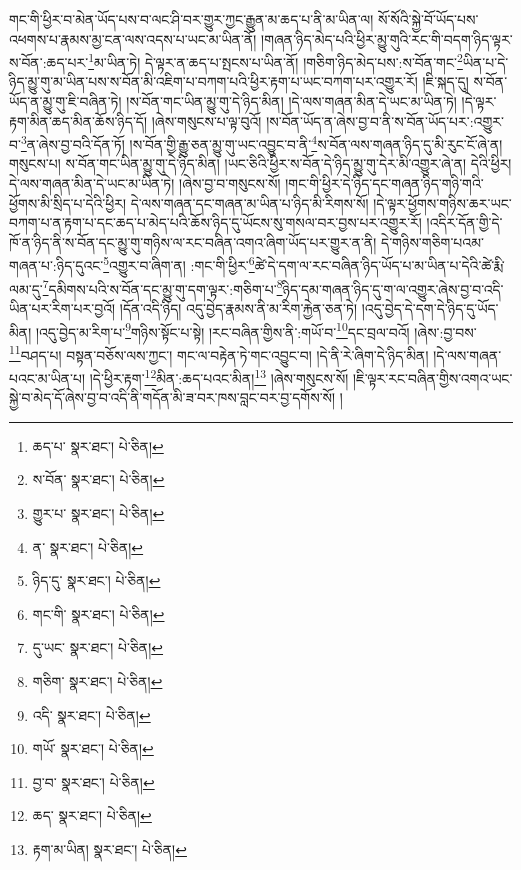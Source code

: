 གང་གི་ཕྱིར་བ་མེན་ཡོད་པས་བ་ལང་ཤི་བར་གྱུར་ཀྱང་རྒྱུན་མ་ཆད་པ་ནི་མ་ཡིན་ལ། སོ་སོའི་སྐྱེ་བོ་ཡོད་པས་འཕགས་པ་རྣམས་མྱ་ངན་ལས་འདས་པ་ཡང་མ་ཡིན་ནོ། །གཞན་ཉིད་མེད་པའི་ཕྱིར་མྱུ་གུའི་རང་གི་བདག་ཉིད་ལྟར་ས་བོན་:ཆད་པར་\footnote{ཆད་པ་  སྣར་ཐང་།  པེ་ཅིན། }མ་ཡིན་ཏེ། དེ་ལྟར་ན་ཆད་པ་སྤངས་པ་ཡིན་ནོ། །གཅིག་ཉིད་མེད་པས་:ས་བོན་གང་\footnote{ས་བོན་  སྣར་ཐང་།  པེ་ཅིན། }ཡིན་པ་དེ་ཉིད་མྱུ་གུ་མ་ཡིན་པས་ས་བོན་མི་འཇིག་པ་བཀག་པའི་ཕྱིར་རྟག་པ་ཡང་བཀག་པར་འགྱུར་རོ། །ཇི་སྐད་དུ། ས་བོན་ཡོད་ན་མྱུ་གུ་ཇི་བཞིན་ཏེ། །ས་བོན་གང་ཡིན་མྱུ་གུ་དེ་ཉིད་མིན། །དེ་ལས་གཞན་མིན་དེ་ཡང་མ་ཡིན་ཏེ། །དེ་ལྟར་རྟག་མིན་ཆད་མིན་ཆོས་ཉིད་དོ། །ཞེས་གསུངས་པ་ལྟ་བུའོ། །ས་བོན་ཡོད་ན་ཞེས་བྱ་བ་ནི་ས་བོན་ཡོད་པར་:འགྱུར་བ་\footnote{གྱུར་པ་  སྣར་ཐང་།  པེ་ཅིན། }ན་ཞེས་བྱ་བའི་དོན་ཏོ། །ས་བོན་གྱི་རྒྱུ་ཅན་མྱུ་གུ་ཡང་འབྱུང་བ་ནི་\footnote{ན་  སྣར་ཐང་།  པེ་ཅིན། }ས་བོན་ལས་གཞན་ཉིད་དུ་མི་རུང་ངོ་ཞེ་ན། གསུངས་པ། ས་བོན་གང་ཡིན་མྱུ་གུ་དེ་ཉིད་མིན། །ཡང་ཅིའི་ཕྱིར་ས་བོན་དེ་ཉིད་མྱུ་གུ་དེར་མི་འགྱུར་ཞེ་ན། དེའི་ཕྱིར། དེ་ལས་གཞན་མིན་དེ་ཡང་མ་ཡིན་ཏེ། །ཞེས་བྱ་བ་གསུངས་སོ། །གང་གི་ཕྱིར་དེ་ཉིད་དང་གཞན་ཉིད་གཉི་གའི་ཕྱོགས་མི་སྲིད་པ་དེའི་ཕྱིར། དེ་ལས་གཞན་དང་གཞན་མ་ཡིན་པ་ཉིད་མི་རིགས་སོ། །དེ་ལྟར་ཕྱོགས་གཉིས་ཆར་ཡང་བཀག་པ་ན་རྟག་པ་དང་ཆད་པ་མེད་པའི་ཆོས་ཉིད་དུ་ཡོངས་སུ་གསལ་བར་བྱས་པར་འགྱུར་རོ། །འདིར་དོན་གྱི་དེ་ཁོ་ན་ཉིད་ནི་ས་བོན་དང་མྱུ་གུ་གཉིས་ལ་རང་བཞིན་འགའ་ཞིག་ཡོད་པར་གྱུར་ན་ནི། དེ་གཉིས་གཅིག་པའམ་གཞན་པ་:ཉིད་དུའང་\footnote{ཉིད་དུ་  སྣར་ཐང་།  པེ་ཅིན། }འགྱུར་བ་ཞིག་ན། :གང་གི་ཕྱིར་\footnote{གང་གི་  སྣར་ཐང་།  པེ་ཅིན། }ཚེ་དེ་དག་ལ་རང་བཞིན་ཉིད་ཡོད་པ་མ་ཡིན་པ་དེའི་ཚེ་རྨི་ལམ་དུ་\footnote{དུ་ཡང་  སྣར་ཐང་།  པེ་ཅིན། }དམིགས་པའི་ས་བོན་དང་མྱུ་གུ་དག་ལྟར་:གཅིག་པ་\footnote{གཅིག་  སྣར་ཐང་།  པེ་ཅིན། }ཉིད་དམ་གཞན་ཉིད་དུ་ག་ལ་འགྱུར་ཞེས་བྱ་བ་འདི་ཡིན་པར་རིག་པར་བྱའོ། །དོན་འདི་ཉིད། འདུ་བྱེད་རྣམས་ནི་མ་རིག་རྐྱེན་ཅན་ཏེ། །འདུ་བྱེད་དེ་དག་དེ་ཉིད་དུ་ཡོད་མིན། །འདུ་བྱེད་མ་རིག་པ་\footnote{འདི་  སྣར་ཐང་།  པེ་ཅིན། }གཉིས་སྟོང་པ་སྟེ། །རང་བཞིན་གྱིས་ནི་:གཡོ་བ་\footnote{གཡོ་  སྣར་ཐང་།  པེ་ཅིན། }དང་བྲལ་བའོ། །ཞེས་:བྱ་བས་\footnote{བྱ་བ་  སྣར་ཐང་།  པེ་ཅིན། }བཤད་པ། བསྟན་བཅོས་ལས་ཀྱང་། གང་ལ་བརྟེན་ཏེ་གང་འབྱུང་བ། །དེ་ནི་རེ་ཞིག་དེ་ཉིད་མིན། །དེ་ལས་གཞན་པའང་མ་ཡིན་པ། །དེ་ཕྱིར་རྟག་\footnote{ཆད་  སྣར་ཐང་།  པེ་ཅིན། }མིན་:ཆད་པའང་མིན།\footnote{རྟག་མ་ཡིན།  སྣར་ཐང་།  པེ་ཅིན། } །ཞེས་གསུངས་སོ། །ཇི་ལྟར་རང་བཞིན་གྱིས་འགའ་ཡང་སྐྱེ་བ་མེད་དོ་ཞེས་བྱ་བ་འདི་ནི་གདོན་མི་ཟ་བར་ཁས་བླང་བར་བྱ་དགོས་སོ། །
